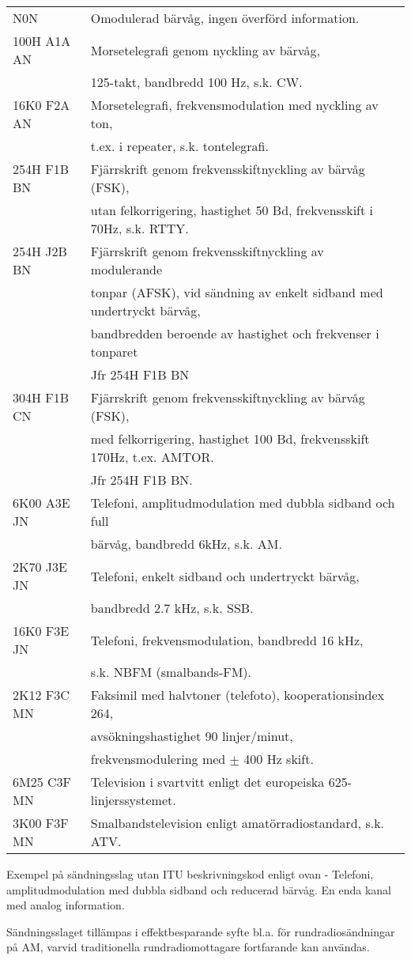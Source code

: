 \begin{tabular}{ll}
	N0N & Omodulerad bärvåg, ingen överförd information.\\
	100H A1A AN & Morsetelegrafi genom nyckling av bärvåg,\\
	& 125-takt, bandbredd 100 Hz, s.k. CW.\\
	16K0 F2A AN & Morsetelegrafi, frekvensmodulation med nyckling av ton,\\
	& t.ex. i repeater, s.k. tontelegrafi.\\
	254H F1B BN & Fjärrskrift genom frekvensskiftnyckling av bärvåg (FSK),\\
	& utan felkorrigering, hastighet 50 Bd, frekvensskift i 70Hz, s.k. RTTY.\\
	254H J2B BN & Fjärrskrift genom frekvensskiftnyckling av modulerande\\
	& tonpar (AFSK), vid sändning av enkelt sidband med undertryckt bärvåg,\\
	& bandbredden beroende av hastighet och frekvenser i tonparet\\
	& Jfr 254H F1B BN\\
	304H F1B CN & Fjärrskrift genom frekvensskiftnyckling av bärvåg (FSK),\\
	& med felkorrigering, hastighet 100 Bd, frekvensskift 170Hz, t.ex. AMTOR.\\
	& Jfr 254H F1B BN.\\
	6K00 A3E JN & Telefoni, amplitudmodulation med dubbla sidband och full\\
	& bärvåg, bandbredd 6kHz, s.k. AM.\\
	2K70 J3E JN & Telefoni, enkelt sidband och undertryckt bärvåg,\\
	& bandbredd 2.7 kHz, s.k. SSB.\\
	16K0 F3E JN & Telefoni, frekvensmodulation, bandbredd 16 kHz,\\
	& s.k. NBFM (smalbands-FM).\\
	2K12 F3C MN & Faksimil med halvtoner (telefoto), kooperationsindex 264,\\
	& avsökningshastighet 90 linjer/minut,\\
	& frekvensmodulering med \(\pm\) 400 Hz skift.\\
	6M25 C3F MN & Television i svartvitt enligt det europeiska 625-linjerssystemet.\\
	3K00 F3F MN & Smalbandstelevision enligt amatörradiostandard, s.k. ATV.\\
\end{tabular}

Exempel på sändningsslag utan ITU beskrivningskod enligt ovan
- Telefoni, amplitudmodulation med dubbla sidband och reducerad bärvåg.
En enda kanal med analog information.

Sändningsslaget tillämpas i effektbesparande syfte bl.a. för rundradiosändningar
på AM, varvid traditionella rundradiomottagare fortfarande kan användas.